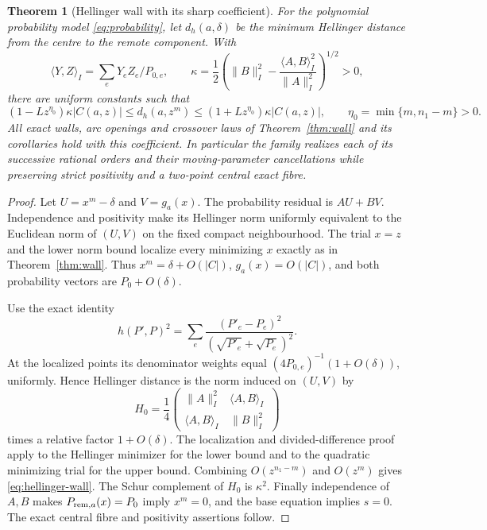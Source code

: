 \documentclass[11pt,reqno]{amsart}
\numberwithin{equation}{section}
\newtheorem{theorem}{Theorem}[section]
\theoremstyle{definition}
\theoremstyle{remark}
\begin{document}
\begin{theorem}[Hellinger wall with its sharp coefficient]\label{thm:probability}
For the polynomial probability model \eqref{eq:probability}, let $d_h(a,\delta)$ be the minimum Hellinger distance from the centre to the remote component. With
\[
 \langle Y,Z\rangle_I=\sum_eY_eZ_e/P_{0,e},\qquad
 \kappa=\frac12\left(\|B\|_I^2-
               \frac{\langle A,B\rangle_I^2}{\|A\|_I^2}\right)^{1/2}>0,
\]
there are uniform constants such that
\begin{equation}\label{eq:hellinger-wall}
 (1-Lz^{\eta_0})\kappa|C(a,z)|
 \le d_h(a,z^m)\le
 (1+Lz^{\eta_0})\kappa|C(a,z)|,
 \qquad \eta_0=\min\{m,n_1-m\}>0.
\end{equation}
All exact walls, arc openings and crossover laws of Theorem~\ref{thm:wall} and its corollaries hold with this coefficient. In particular the family realizes each of its successive rational orders and their moving-parameter cancellations while preserving strict positivity and a two-point central exact fibre.
\end{theorem}
\begin{proof}
Let $U=x^m-\delta$ and $V=g_a(x)$. The probability residual is $AU+BV$. Independence and positivity make its Hellinger norm uniformly equivalent to the Euclidean norm of $(U,V)$ on the fixed compact neighbourhood. The trial $x=z$ and the lower norm bound localize every minimizing $x$ exactly as in Theorem~\ref{thm:wall}. Thus $x^m=\delta+O(|C|)$, $g_a(x)=O(|C|)$, and both probability vectors are $P_0+O(\delta)$.

Use the exact identity
\[
 h(P',P)^2=\sum_e\frac{(P'_e-P_e)^2}{(\sqrt{P'_e}+\sqrt{P_e})^2}.
\]
At the localized points its denominator weights equal $(4P_{0,e})^{-1}(1+O(\delta))$, uniformly. Hence Hellinger distance is the norm induced on $(U,V)$ by
\[
 H_0=\frac14
 \begin{pmatrix}\|A\|_I^2&\langle A,B\rangle_I\\
                 \langle A,B\rangle_I&\|B\|_I^2\end{pmatrix}
\]
times a relative factor $1+O(\delta)$. The localization and divided-difference proof apply to the Hellinger minimizer for the lower bound and to the quadratic minimizing trial for the upper bound. Combining $O(z^{n_1-m})$ and $O(z^m)$ gives \eqref{eq:hellinger-wall}. The Schur complement of $H_0$ is $\kappa^2$. Finally independence of $A,B$ makes $P_{{\rm rem},a}(x)=P_0$ imply $x^m=0$, and the base equation implies $s=0$. The exact central fibre and positivity assertions follow.
\end{proof}
\end{document}
